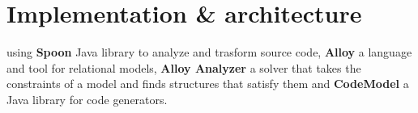 \section{Implementation \& architecture}
\label{sec:Implementation}
 using \textbf{Spoon} Java library to analyze and trasform source code, \textbf{Alloy} a language and tool for relational models, \textbf{Alloy Analyzer} a solver that takes the constraints of a model and finds structures that satisfy them and \textbf{CodeModel} a Java library for code generators.